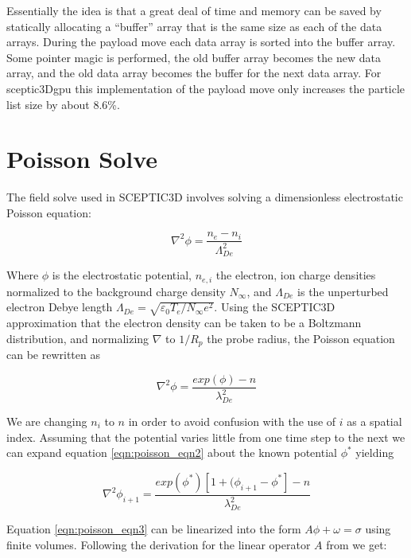 		Essentially the idea is that a great deal of time and memory can be saved by statically allocating a ``buffer'' array that is the same size as each of the data arrays. During the payload move each data array is sorted into the buffer array. Some pointer magic is performed, the old buffer array becomes the new data array, and the old data array becomes the buffer for the next data array. For sceptic3Dgpu this implementation of the payload move only increases the particle list size by about 8.6\%.



	\section{Poisson Solve}
The field solve used in SCEPTIC3D involves solving a dimensionless electrostatic Poisson equation:

\begin{equation}
\nabla^2\phi=\frac{n_e-n_i}{\Lambda_{De}^2}
\label{eqn:poisson_eqn1}
\end{equation}

Where $\phi$ is the electrostatic potential, $n_{e,i}$ the electron, ion charge densities normalized to the background charge density $N_\infty$, and $\Lambda_{De}$ is the unperturbed electron Debye length $\Lambda_{De} = \sqrt{\varepsilon_0T_e/N_\infty e^2}$. Using the SCEPTIC3D approximation that the electron density can be taken to be a Boltzmann distribution, and normalizing $\nabla$ to $1/R_p$ the probe radius, the Poisson equation can be rewritten as 

\begin{equation}
\nabla^2\phi=\frac{exp(\phi)-n}{\lambda_{De}^2}
\label{eqn:poisson_eqn2}
\end{equation}

We are changing $n_i$ to $n$ in order to avoid confusion with the use of $i$ as a spatial index. Assuming that the potential varies little from one time step to the next we can expand equation \ref{eqn:poisson_eqn2} about the known potential $\phi^*$ yielding
   
\begin{equation}
\nabla^2\phi_{i+1}=\frac{exp(\phi^*)[1+(\phi_{i+1}-\phi^*]-n}{\lambda_{De}^2}
\label{eqn:poisson_eqn3}
\end{equation}

Equation \ref{eqn:poisson_eqn3} can be linearized into the form $A\phi+\omega = \sigma$ using finite volumes. Following the derivation for the linear operator $A$ from \cite{Patacchini2010} we get:


